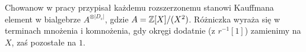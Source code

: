 Chowanow w pracy \cite{khovanov00} przypisał każdemu rozszerzonemu stanowi Kauffmana
element w bialgebrze $A^{\otimes |D_s|}$, gdzie $A = \mathbb Z[X]/(X^2)$.
Różniczka wyraża się w terminach mnożenia i komnożenia,
gdy okręgi dodatnie (z $r^{-1}[1]$) zamienimy na $X$, zaś pozostałe na $1$.


